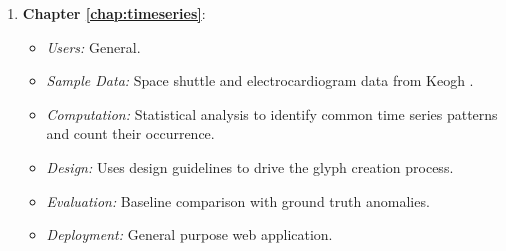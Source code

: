 \begin{enumerate}
\item \textbf{Chapter \ref{chap:timeseries}}:
\begin{itemize}
\item \emph{Users:} General.
\item \emph{Sample Data:} Space shuttle and electrocardiogram data from Keogh \etal \cite{shuttle_data} .
\item \emph{Computation:} Statistical analysis to identify common time series patterns and count their occurrence.
\item \emph{Design:} Uses design guidelines to drive the glyph creation process.
\item \emph{Evaluation:} Baseline comparison with ground truth anomalies.
\item \emph{Deployment:} General purpose web application.
\end{itemize}


\end{enumerate}
